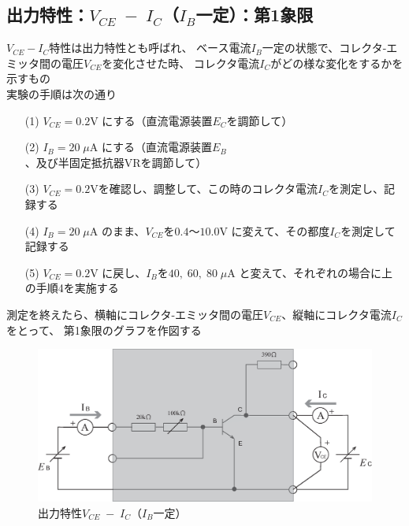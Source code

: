 \documentclass[uplatex,a4paper,11pt,oneside,openany]{jsbook}
\begin{document}
\subsection{出力特性：$V_{CE}\;-\;I_C$（$I_B$一定）：第1象限}

$V_{CE}-I_C$特性は出力特性とも呼ばれ、
ベース電流$I_B$一定の状態で、コレクタ-エミッタ間の電圧$V_{CE}$を変化させた時、
コレクタ電流$I_C$がどの様な変化をするかを示すもの\\

実験の手順は次の通り

\begin{enumerate}
\item[(1)] $V_{CE}=0.2$V にする（直流電源装置$E_C$を調節して）
\item[(2)] $I_B=20\;\mu$A にする（直流電源装置$E_B$、及び半固定抵抗器VRを調節して）
\item[(3)] $V_{CE}=0.2$Vを確認し、調整して、この時のコレクタ電流$I_C$を測定し、記録する
\item[(4)] $I_B=20\;\mu$A のまま、$V_{CE}$を$0.4$〜$10.0$V に変えて、その都度$I_C$を測定して記録する
\item[(5)] $V_{CE}=0.2$V に戻し、$I_B$を$40,\;60,\;80\;\mu$A と変えて、それぞれの場合に上の手順4を実施する    
\end{enumerate}

測定を終えたら、横軸にコレクタ-エミッタ間の電圧$V_{CE}$、縦軸にコレクタ電流$I_C$をとって、
第1象限のグラフを作図する

\vfill

\begin{figure}[H]
  \centering
   \includegraphics[keepaspectratio, scale=0.5, angle=0]
               {figs/eps/ex1.eps}
               \caption{出力特性$V_{CE}\;-\;I_C$（$I_B$一定）}
               \label{fig:ex1}
\end{figure}

\vfill

\newpage
\end{document}
